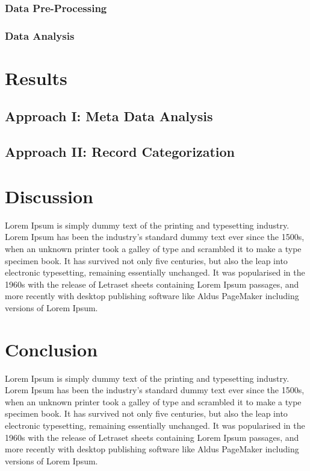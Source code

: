 \documentclass[11pt, notitlepage,abstracton,oneside]{article}   	%
\begin{document}
\subsubsection{Data Pre-Processing}

\subsubsection{Data Analysis}

\section{Results}

\subsection{Approach I: Meta Data Analysis}

\subsection{Approach II: Record Categorization}

\section{Discussion}
Lorem Ipsum is simply dummy text of the printing and typesetting industry. Lorem Ipsum has been the industry's standard dummy text ever since the 1500s, when an unknown printer took a galley of type and scrambled it to make a type specimen book. It has survived not only five centuries, but also the leap into electronic typesetting, remaining essentially unchanged. It was popularised in the 1960s with the release of Letraset sheets containing Lorem Ipsum passages, and more recently with desktop publishing software like Aldus PageMaker including versions of Lorem Ipsum.

\section{Conclusion}
Lorem Ipsum is simply dummy text of the printing and typesetting industry. Lorem Ipsum has been the industry's standard dummy text ever since the 1500s, when an unknown printer took a galley of type and scrambled it to make a type specimen book. It has survived not only five centuries, but also the leap into electronic typesetting, remaining essentially unchanged. It was popularised in the 1960s with the release of Letraset sheets containing Lorem Ipsum passages, and more recently with desktop publishing software like Aldus PageMaker including versions of Lorem Ipsum.




\end{document}
